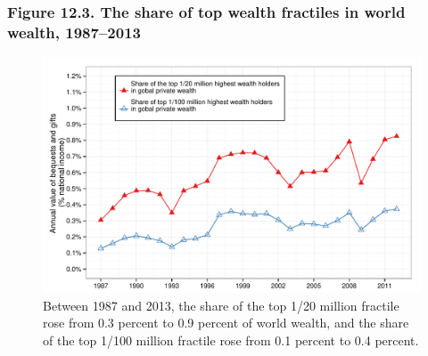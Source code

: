 \documentclass[t]{beamer}\usepackage[]{graphicx}\usepackage[]{color}
\newenvironment{knitrout}{}{} %
\begin{document}
\begin{frame}[label=Figure_12_3]
\frametitle{Figure 12.3. The share of top wealth fractiles in world wealth, 1987--2013}
\begin{figure}[t]
\begin{minipage}[b]{\textwidth}
\centering
\begin{knitrout}\footnotesize
{}\color{fgcolor}

{\centering \includegraphics[width=1\linewidth]{figures/color/Figure_12_3} 

}



\end{knitrout}
\caption{Between 1987 and 2013, the share of the top 1/20 million fractile rose from 0.3 percent to 0.9 percent of world wealth, and the share of the top 1/100 million fractile rose from 0.1 percent to 0.4 percent.}
\end{minipage}
\end{figure}
\end{frame}
\end{document}
